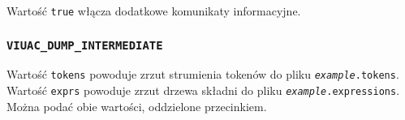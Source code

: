 Wartość \texttt{true} włącza dodatkowe komunikaty informacyjne.

\subsubsection{\texttt{VIUAC\_DUMP\_INTERMEDIATE}}

Wartość \texttt{tokens} powoduje zrzut strumienia tokenów do pliku \texttt{\emph{example}.tokens}.
Wartość \texttt{exprs} powoduje zrzut drzewa składni do pliku \texttt{\emph{example}.expressions}.
Można podać obie wartości, oddzielone przecinkiem.
